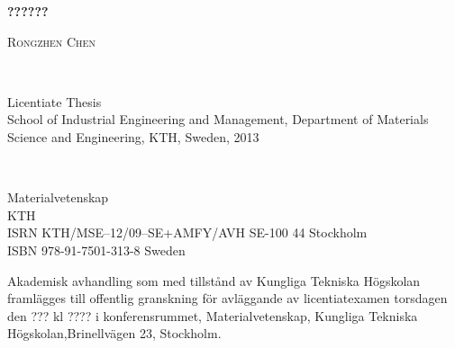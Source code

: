 \documentclass[a4paper, 12pt, titlepage,oneside,drop]{kthesis}
\begin{document}
\setcounter{page}{1}

\begin{center}




  \vspace{5 cm}





  \vspace{12pt}
  \textsc{\LARGE{\textbf{??????}}}
  \vspace{12pt}



  \vspace{5 cm}

  \textsc{\large{Rongzhen Chen}}


  \vfill %

  \ %

  \large{Licentiate Thesis}
  \\
  \large{School of Industrial Engineering and Management,
  Department of Materials Science and Engineering,
  KTH, Sweden, 2013}

\end{center}

 \thispagestyle{empty}


\newpage
\setcounter{page}{2}
\thispagestyle{empty}
\
\vfill

\begin{flushright}
 Materialvetenskap\\
 KTH\\
ISRN KTH/MSE--12/09--SE+AMFY/AVH
 \hfill SE-100 44 Stockholm\\ ISBN 978-91-7501-313-8  \hfill
Sweden\\
\end{flushright}


\vspace{5mm}

Akademisk avhandling som med tillstånd av Kungliga Tekniska
Högskolan framlägges till offentlig granskning för avläggande av
licentiatexamen torsdagen den ???\linebreak 2013 kl ???? i
konferensrummet, Materialvetenskap, Kungliga Tekniska
Högskolan,\linebreak Brinellvägen 23, Stockholm.
\end{document}
